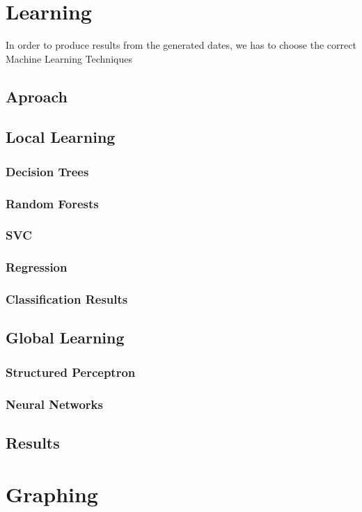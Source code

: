 \documentclass[bsc,frontabs,twoside,singlespacing,parskip,deptreport]{infthesis}     %
\begin{document}
\chapter{Learning}
In order to produce results from the generated dates,
we has to choose the correct Machine Learning Techniques
\section{Aproach}

\section{Local Learning}
\subsection{Decision Trees}
\subsection{Random Forests}
\subsection{SVC}
\subsection{Regression}
\subsection{Classification Results}

\section{Global Learning}
\subsection{Structured Perceptron}
\subsection{Neural Networks}

\section{Results}

\chapter{Graphing}
\end{document}
